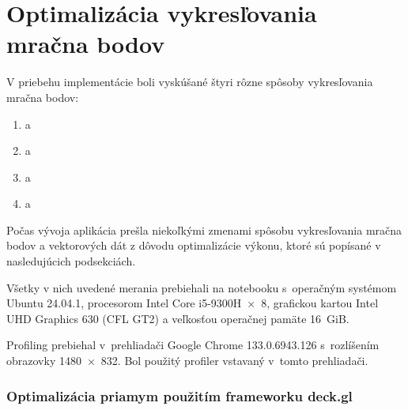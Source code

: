 \section{Optimalizácia vykresľovania mračna bodov}

V priebehu implementácie boli vyskúšané štyri rôzne spôsoby vykresľovania mračna bodov:
\begin{enumerate}
    \item a
    \item a
    \item a
    \item a
\end{enumerate}



Počas vývoja aplikácia prešla niekoľkými zmenami spôsobu vykresľovania mračna bodov a vektorových dát z dôvodu optimalizácie výkonu, ktoré sú popísané v nasledujúcich podsekciách.

Všetky v nich uvedené merania prebiehali na notebooku s~operačným systémom Ubuntu 24.04.1, procesorom Intel Core i5-9300H~×~8, grafickou kartou Intel UHD Graphics 630 (CFL GT2) a veľkosťou operačnej pamäte 16~GiB.

Profiling prebiehal v~prehliadači Google Chrome 133.0.6943.126 s~rozlíšením obrazovky 1480~×~832. Bol použitý profiler vstavaný v~tomto prehliadači.

\subsubsection{Optimalizácia priamym použitím frameworku deck.gl}

